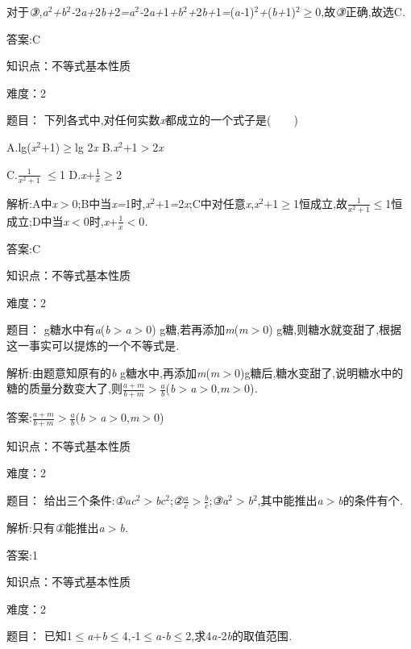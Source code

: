 \documentclass{article} %
\begin{document}
对于\textit{③},\textit{a}${}^{2}$\textit{+b}${}^{2}$\textit{-}2\textit{a+}2\textit{b+}2\textit{=a}${}^{2}$\textit{-}2\textit{a+}1\textit{+b}${}^{2}$\textit{+}2\textit{b+}1\textit{=}(\textit{a-}1)${}^{2}$\textit{+}(\textit{b+}1)${}^{2}$$\mathrm{\ge}$0,故\textit{③}正确,故选C\textit{.}

 答案:C

知识点：不等式基本性质

难度：2

 题目：
下列各式中,对任何实数\textit{x}都成立的一个式子是(\textit{　　})

 A.lg(\textit{x}${}^{2}$\textit{$+$}1)$\mathrm{\ge}$lg 2\textit{x} B.\textit{x}${}^{2}$\textit{$+$}1\textit{$>$}2\textit{x}

 C.$\frac{1}{x^2+1}$
$\mathrm{\le}$1 D.\textit{x$+$}$\frac{1}{x}$$\mathrm{\ge}$2

 解析:A中\textit{x$>$}0;B中当\textit{x=}1时,\textit{x}${}^{2}$\textit{$+$}1\textit{=}2\textit{x};C中对任意\textit{x},\textit{x}${}^{2}$\textit{$+$}1$\mathrm{\ge}$1恒成立,故$\frac{1}{x^2+1}$$\mathrm{\le}$1恒成立;D中当\textit{x$<$}0时,\textit{x$+\frac{1}{x}$}\textit{$<$}0\textit{.}

 答案:C


知识点：不等式基本性质

难度：2


 题目：
g糖水中有\textit{a}(\textit{b$>$a$>$}0) g糖,若再添加\textit{m}(\textit{m$>$}0) g糖,则糖水就变甜了,根据这一事实可以提炼的一个不等式是\textit{\underbar{　　　　　　　　　　}.~}

 解析:由题意知原有的\textit{b} g糖水中,再添加\textit{m}(\textit{m$>$}0)g糖后,糖水变甜了,说明糖水中的糖的质量分数变大了,则$\frac{a+m}{b+m}>\frac{a}{b}$(\textit{b$>$a$>$}0,\textit{m$>$}0)\textit{.}

 答案:$\frac{a+m}{b+m}>\frac{a}{b}$(\textit{b$>$a$>$}0,\textit{m$>$}0)

知识点：不等式基本性质

难度：2

 题目： 给出三个条件:\textit{①}\textit{ac}${}^{2}$\textit{$>$bc}${}^{2}$;\textit{②}$\frac{a}{c}>\frac{b}{c}$;\textit{③}\textit{a}${}^{2}$\textit{$>$b}${}^{2}$,其中能推出\textit{a$>$b}的条件有\textit{\underbar{　　　　　}}个\textit{.~}

 解析:只有\textit{①}能推出\textit{a$>$b.}

 答案:1

知识点：不等式基本性质

难度：2

 题目：
已知1$\mathrm{\le}$\textit{a$+$b}$\mathrm{\le}$4,\textit{-}1$\mathrm{\le}$\textit{a-b}$\mathrm{\le}$2,求4\textit{a-}2\textit{b}的取值范围\textit{.}
\end{document}
